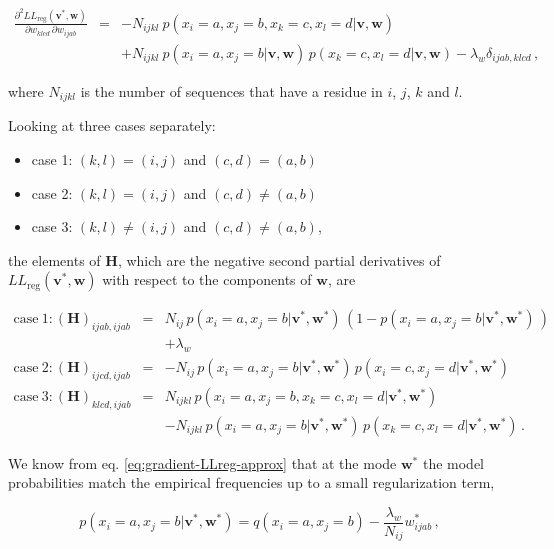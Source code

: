 \documentclass[12pt,a4paper,twoside]{book}
\providecommand{\tightlist}{%
  \setlength{\itemsep}{0pt}\setlength{\parskip}{0pt}}
\newcommand{\eq}{\!=\!}
\renewcommand{\H}{\mathbf{H}}
\newcommand{\LLreg}{L\!L_\mathrm{reg}}
\renewcommand{\v}{\mathbf{v}}
\newcommand{\w}{\mathbf{w}}
\newcommand{\wijab}{w_{ijab}}
\newcommand{\wklcd}{w_{klcd}}
\theoremstyle{definition}
\theoremstyle{definition}
\theoremstyle{remark}
\begin{document}
\begin{eqnarray}
    \frac{\partial^2 \LLreg(\v^*,\w)}{\partial \wklcd \, \partial \wijab  } 
    &=& - N_{ijkl} \: p(x_i \eq a, x_j \eq b, x_k \eq c, x_l \eq d | \v,\w)  \nonumber \\
    && +  N_{ijkl} \: p(x_i \eq a, x_j \eq b | \v,\w) \, p(x_k \eq c, x_l \eq d | \v,\w) - \lambda_w \delta_{ijab,klcd} \,,
\end{eqnarray}

where \(N_{ijkl}\) is the number of sequences that have a residue in
\(i\), \(j\), \(k\) and \(l\).

Looking at three cases separately:

\begin{itemize}
\tightlist
\item
  case 1: \((k,l) = (i,j)\) and \((c,d) = (a,b)\)
\item
  case 2: \((k,l) = (i,j)\) and \((c,d) \ne (a,b)\)
\item
  case 3: \((k,l) \ne (i,j)\) and \((c,d) \ne (a,b)\),
\end{itemize}

the elements of \(\H\), which are the negative second partial
derivatives of \(\LLreg(\v^*,\w)\) with respect to the components of
\(\w\), are

\begin{eqnarray}
    \mathrm{case~1:} (\H)_{ijab, ijab}  
    &=&  N_{ij} \, p(x_i \eq a, x_j \eq b| \v^*,\w^*) \, ( 1 - p(x_i \eq a, x_j \eq b| \v^*,\w^*) \,) \\
    &&   + \lambda_w \\
    \mathrm{case~2:} (\H)_{ijcd, ijab}  
    &=&  - N_{ij} \, p(x_i \eq a, x_j \eq b |\v^*,\w^*) \, p(x_i \eq c, x_j \eq d |\v^*,\w^*) \\
    \mathrm{case~3:} (\H)_{klcd, ijab}  
    &=&   N_{ijkl} \, p(x_i \eq a, x_j \eq b, x_k \eq c, x_l \eq d  | \v^*,\w^*) \nonumber \\
    &&    - N_{ijkl} \, p(x_i \eq a, x_j \eq b | \v^*,\w^*)\, p(x_k \eq c, x_l \eq d | \v^*,\w^*) \,.
\label{eq:Hw-offdiag}
\end{eqnarray}

We know from eq. \eqref{eq:gradient-LLreg-approx} that at the mode
\(\w^*\) the model probabilities match the empirical frequencies up to a
small regularization term,

\begin{equation}
    p(x_i \eq a, x_j \eq b | \v^*,\w^*) = q(x_i \eq a, x_j \eq b) - \frac{\lambda_w}{N_{ij}}  \wijab^* \,,
\end{equation}
\end{document}
